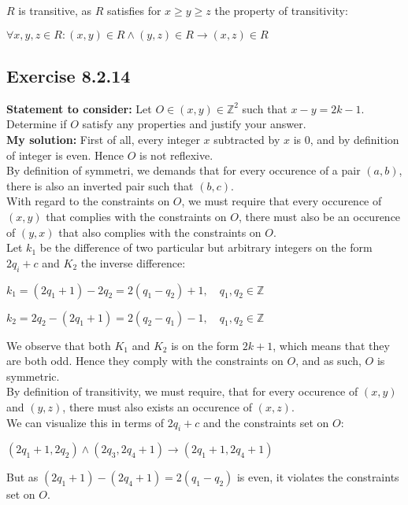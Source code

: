 \documentclass{report}
\newcommand{\cent}[1]{\begin{center}#1\end{center}}
\newcommand{\doubleZ}{\mathbb{Z}}
\newcommand{\In}{\! \in \!}
\newcommand{\assignmentDescription}{\textbf{Statement to consider: }}
\newcommand{\solution}{\textbf{My solution: }}
\newcommand{\Exercise}[1]{\subsection{Exercise #1}}
\begin{document}
	 $R$ is transitive, as $R$ satisfies for $x \geq y \geq z$ the property of transitivity:
	 
	 \cent{$\forall x,y,z \In R : (x,y) \In R  \wedge (y,z) \In R \to (x,z) \In R$}
	 
	 \Exercise{8.2.14}
	 
	 \assignmentDescription
	 Let $O\In (x,y) \In \doubleZ^2$ such that $x-y = 2k-1$. Determine if $O$ satisfy any properties and justify your answer.\\
	 
	 \solution
	 First of all, every integer $x$ subtracted by $x$ is 0, and by definition of integer is even. Hence $O$ is not reflexive.\\
	 
	 By definition of symmetri, we demands that for every occurence of a pair $(a,b)$, there is also an inverted pair such that $(b,c)$.\\ 
	 
	 With regard to the constraints on $O$, we must require that every occurence of $(x,y)$ that complies with the constraints on $O$, there must also be an occurence of $(y,x)$ that also complies with the constraints on $O$.\\
	 
	 Let $k_1$ be the difference of two particular but arbitrary integers on the form $2q_i + c$ and $K_2$ the inverse difference:
	 
	 \cent{$k_1 = (2q_1+1) - 2q_2 = 2(q_1 - q_2) + 1, \quad q_1,q_2 \In \doubleZ$}
	 
	 \cent{$k_2 = 2q_2  - (2q_1 + 1) = 2(q_2 -q_1) - 1, \quad q_1,q_2 \In \doubleZ$}
	 
	 We observe that both $K_1$ and $K_2$ is on the form $2k +1$, which means that they are both odd. Hence they comply with the constraints on $O$, and as such, $O$ is symmetric.\\
	 
	 By definition of transitivity, we must require, that for every occurence of $(x,y)$ and $(y,z)$, there must also exists an occurence of $(x,z)$.\\
	 
	 We can visualize this in terms of $2q_i + c$ and the constraints set on $O$:
	 
	 \cent{$(2q_1+1,2q_2) \wedge (2q_3,2q_4 + 1) \to (2q_1 + 1, 2q_4+1)$}
	 
	 But as $(2q_1 + 1) - (2q_4 + 1) = 2(q_1 - q_2)$ is even, it violates the constraints set on $O$.\\ 
	 
\end{document}
